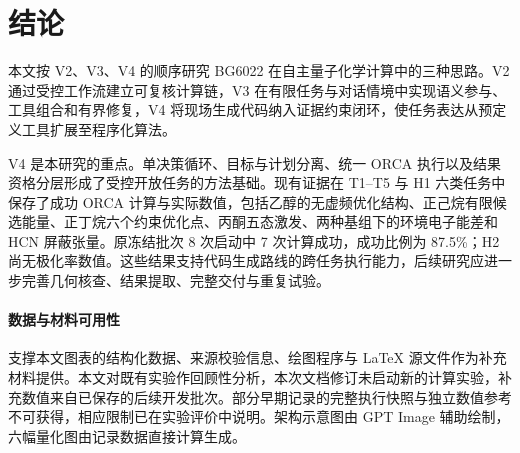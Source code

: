 \section{结论}
本文按 V2、V3、V4 的顺序研究 BG6022 在自主量子化学计算中的三种思路。V2 通过受控工作流建立可复核计算链，V3 在有限任务与对话情境中实现语义参与、工具组合和有界修复，V4 将现场生成代码纳入证据约束闭环，使任务表达从预定义工具扩展至程序化算法。

V4 是本研究的重点。单决策循环、目标与计划分离、统一 ORCA 执行以及结果资格分层形成了受控开放任务的方法基础。现有证据在 T1--T5 与 H1 六类任务中保存了成功 ORCA 计算与实际数值，包括乙醇的无虚频优化结构、正己烷有限候选能量、正丁烷六个约束优化点、丙酮五态激发、两种基组下的环境电子能差和 HCN 屏蔽张量。原冻结批次 8 次启动中 7 次计算成功，成功比例为 87.5\%；H2 尚无极化率数值。这些结果支持代码生成路线的跨任务执行能力，后续研究应进一步完善几何核查、结果提取、完整交付与重复试验。

\paragraph{数据与材料可用性}
支撑本文图表的结构化数据、来源校验信息、绘图程序与 LaTeX 源文件作为补充材料提供。本文对既有实验作回顾性分析，本次文档修订未启动新的计算实验，补充数值来自已保存的后续开发批次。部分早期记录的完整执行快照与独立数值参考不可获得，相应限制已在实验评价中说明。架构示意图由 GPT Image 辅助绘制，六幅量化图由记录数据直接计算生成。
